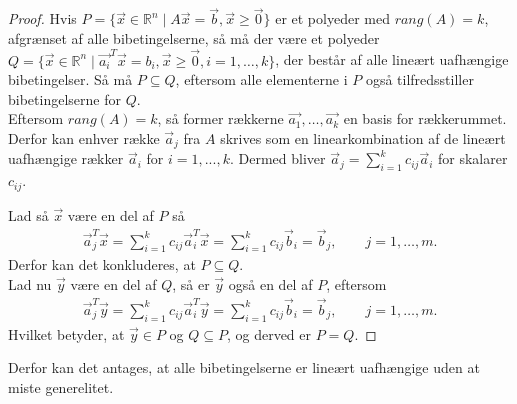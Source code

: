 \begin{proof}
Hvis $P=\{\vec{x} \in \mathds{R}^n\mid A\vec{x}=\vec{b}, \vec{x}\geq \vec{0}\}$ er et polyeder med $rang(A)=k$, afgrænset af alle bibetingelserne, så må der være et polyeder $Q=\{\vec{x} \in \mathds{R}^n\mid \vec{a_i}^T\vec{x}=b_{i}, \vec{x}\geq \vec{0}, i = 1,\dots,	k\}$, der består af alle lineært uafhængige bibetingelser. Så må $P\subseteq Q$, eftersom alle elementerne i $P$ også tilfredsstiller bibetingelserne for $Q$.\\
Eftersom $rang(A)=k$, så former rækkerne $\vec{a_1},\dots ,\vec{a_k}$ en basis for rækkerummet. Derfor kan enhver række $\vec{a}_j$ fra $A$ skrives som en linearkombination af de lineært uafhængige rækker $\vec{a}_i$ for $i = 1,...,k$.
Dermed bliver $\vec{a}_j = \sum_{i=1}^k c_{ij}\vec{a}_i$ for skalarer $c_{ij}$.

 Lad så $\vec{x}$ være en del af $P$ så
\begin{align*}
\vec{a}_j^T\vec{x}=\sum_{i=1}^{k}c_{i j}\vec{a}_i^T\vec{x}=\sum_{i=1}^{k}c_{i j}\vec{b}_i=\vec{b}_j, \qquad j=1,\dots,m.
\end{align*}
Derfor kan det konkluderes, at $P \subseteq Q$.\\
Lad nu $\vec{y}$ være en del af $Q$, så er $\vec{y}$ også en del af $P$, eftersom
\begin{align*}
\vec{a}_j^T\vec{y}=\sum_{i=1}^{k}c_{i j}\vec{a}_i^T\vec{y}=\sum_{i=1}^{k}c_{i j}\vec{b}_i=\vec{b}_j, \qquad j=1,\dots,m.
\end{align*}
Hvilket betyder, at $\vec{y}\in P$ og $Q\subseteq P$, og derved er $P=Q$.
\end{proof}

Derfor kan det antages, at alle bibetingelserne er lineært uafhængige uden at miste generelitet. 


%
